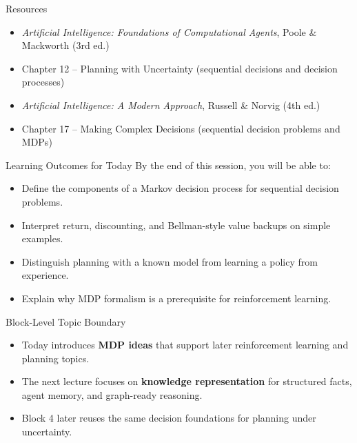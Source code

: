 \documentclass[aspectratio=169]{beamer}
\newcommand{\defaultdeckrefs}{AIMA4e Ch.22 pp.789--822; Poole3e Ch.13 pp.583--608}
\newcommand{\currentsliderefs}{\defaultdeckrefs}
\newcommand{\setslideref}[1]{\gdef\currentsliderefs{#1}}
\begin{document}
\setslideref{AIMA4e Ch.17 -- Making Complex Decisions; Poole3e Ch.12 -- Planning with Uncertainty}
\begin{frame}{Resources}
\begin{itemize}
  \item \textit{Artificial Intelligence: Foundations of Computational Agents}, Poole \& Mackworth (3rd ed.)
  \item Chapter 12 -- Planning with Uncertainty (sequential decisions and decision processes)
  \item \textit{Artificial Intelligence: A Modern Approach}, Russell \& Norvig (4th ed.)
  \item Chapter 17 -- Making Complex Decisions (sequential decision problems and MDPs)
\end{itemize}
\end{frame}

\setslideref{AIMA4e Ch.17 -- Making Complex Decisions; Poole3e Ch.12 -- Planning with Uncertainty}
\begin{frame}{Learning Outcomes for Today}
By the end of this session, you will be able to:
\begin{itemize}
  \item Define the components of a Markov decision process for sequential decision problems.
  \item Interpret return, discounting, and Bellman-style value backups on simple examples.
  \item Distinguish planning with a known model from learning a policy from experience.
  \item Explain why MDP formalism is a prerequisite for reinforcement learning.
\end{itemize}
\end{frame}

\setslideref{AIMA4e Ch.17 -- Making Complex Decisions; Poole3e Ch.12 -- Planning with Uncertainty}
\begin{frame}{Block-Level Topic Boundary}
\begin{itemize}
  \item Today introduces \textbf{MDP ideas} that support later reinforcement learning and planning topics.
  \item The next lecture focuses on \textbf{knowledge representation} for structured facts, agent memory, and graph-ready reasoning.
  \item Block 4 later reuses the same decision foundations for planning under uncertainty.
\end{itemize}
\end{frame}
\end{document}
